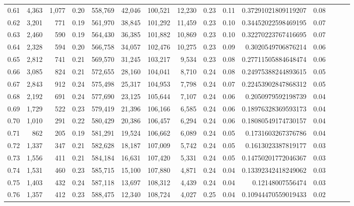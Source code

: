 \begin{tabular}{rrrrrrrrrrrrrrr}
0.61 &   4,363 &  1,077 &  0.20 &  558,769 &   42,046 &  100,521 &   12,230 &  0.23 &  0.11 &   0.37291021809119207 &      0.08 \\
0.62 &   3,201 &    771 &  0.19 &  561,970 &   38,845 &  101,292 &   11,459 &  0.23 &  0.10 &   0.34452022598469195 &      0.07 \\
0.63 &   2,460 &    590 &  0.19 &  564,430 &   36,385 &  101,882 &   10,869 &  0.23 &  0.10 &   0.32270223767416695 &      0.07 \\
0.64 &   2,328 &    594 &  0.20 &  566,758 &   34,057 &  102,476 &   10,275 &  0.23 &  0.09 &    0.3020549706876214 &      0.06 \\
0.65 &   2,812 &    741 &  0.21 &  569,570 &   31,245 &  103,217 &    9,534 &  0.23 &  0.08 &   0.27711505884648474 &      0.06 \\
0.66 &   3,085 &    824 &  0.21 &  572,655 &   28,160 &  104,041 &    8,710 &  0.24 &  0.08 &   0.24975388244893615 &      0.05 \\
0.67 &   2,843 &    912 &  0.24 &  575,498 &   25,317 &  104,953 &    7,798 &  0.24 &  0.07 &   0.22453902847868312 &      0.05 \\
0.68 &   2,192 &    691 &  0.24 &  577,690 &   23,125 &  105,644 &    7,107 &  0.24 &  0.06 &    0.2050979592198739 &      0.04 \\
0.69 &   1,729 &    522 &  0.23 &  579,419 &   21,396 &  106,166 &    6,585 &  0.24 &  0.06 &   0.18976328369593173 &      0.04 \\
0.70 &   1,010 &    291 &  0.22 &  580,429 &   20,386 &  106,457 &    6,294 &  0.24 &  0.06 &   0.18080549174730157 &      0.04 \\
0.71 &     862 &    205 &  0.19 &  581,291 &   19,524 &  106,662 &    6,089 &  0.24 &  0.05 &    0.1731603267376786 &      0.04 \\
0.72 &   1,337 &    347 &  0.21 &  582,628 &   18,187 &  107,009 &    5,742 &  0.24 &  0.05 &    0.1613023387819177 &      0.03 \\
0.73 &   1,556 &    411 &  0.21 &  584,184 &   16,631 &  107,420 &    5,331 &  0.24 &  0.05 &   0.14750201772046367 &      0.03 \\
0.74 &   1,531 &    460 &  0.23 &  585,715 &   15,100 &  107,880 &    4,871 &  0.24 &  0.04 &   0.13392342418249062 &      0.03 \\
0.75 &   1,403 &    432 &  0.24 &  587,118 &   13,697 &  108,312 &    4,439 &  0.24 &  0.04 &      0.12148007556474 &      0.03 \\
0.76 &   1,357 &    412 &  0.23 &  588,475 &   12,340 &  108,724 &    4,027 &  0.25 &  0.04 &   0.10944470559019433 &      0.02 \\

\end{tabular}
